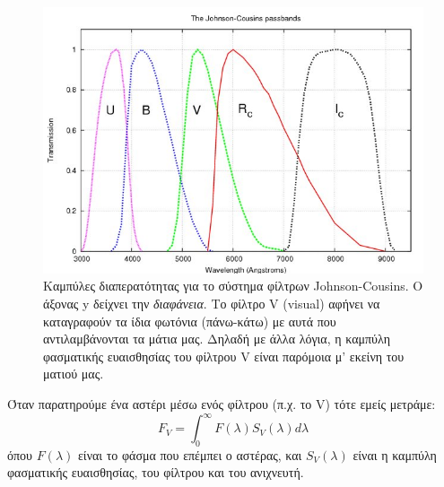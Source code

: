 \begin{figure}
    \centering
    \includegraphics[scale=0.4]{Figures/filter_curves.jpg}
    \caption{Καμπύλες διαπερατότητας για το σύστημα φίλτρων Johnson-Cousins. Ο άξονας y δείχνει την \textit{διαφάνεια}. Το φίλτρο V (visual) αφήνει να καταγραφούν τα ίδια φωτόνια (πάνω-κάτω) με αυτά που αντιλαμβάνονται τα μάτια μας. Δηλαδή με άλλα λόγια, η καμπύλη φασματικής ευαισθησίας του φίλτρου V είναι παρόμοια μ' εκείνη του ματιού μας.}
    \label{fig:filter_curves}
\end{figure}

Όταν παρατηρούμε ένα αστέρι μέσω ενός φίλτρου (π.χ. το V) τότε εμείς μετράμε:
\begin{equation}
    F_V = \int_0^{\infty} F(\lambda) S_V(\lambda) d\lambda
\end{equation}
όπου $F(\lambda)$ είναι το φάσμα που επέμπει ο αστέρας, και $S_V(\lambda)$ είναι η καμπύλη φασματικής ευαισθησίας, του φίλτρου και του ανιχνευτή.

